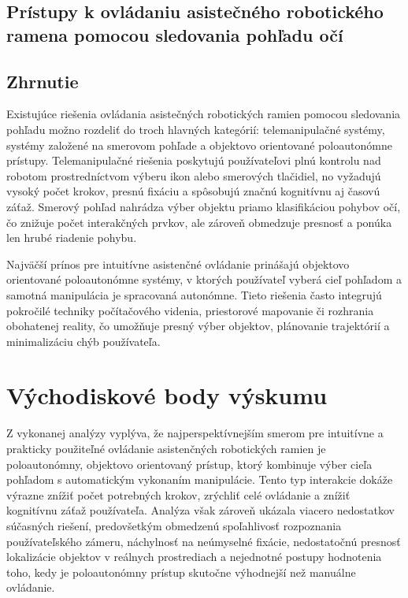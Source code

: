 \documentclass[11pt,english,a4paper]{article}
\begin{document}
        \subsection{Prístupy  k  ovládaniu  asistečného  robotického  ramena  pomocou  sledovania  pohľadu  očí}
        

        \subsection{Zhrnutie}\label{sec:summary}
Existujúce  riešenia  ovládania  asistečných  robotických  ramien  pomocou  sledovania  pohľadu  možno  rozdeliť  do  troch  hlavných  kategórií:  telemanipulačné  systémy,  systémy  založené  na  smerovom  pohľade  a  objektovo  orientované  poloautonómne  prístupy.  Telemanipulačné  riešenia  poskytujú  používateľovi  plnú  kontrolu  nad  robotom  prostredníctvom  výberu  ikon  alebo  smerových  tlačidiel,  no  vyžadujú  vysoký  počet  krokov,  presnú  fixáciu  a  spôsobujú  značnú  kognitívnu  aj  časovú  záťaž.  Smerový  pohľad  nahrádza  výber  objektu  priamo  klasifikáciou  pohybov  očí,  čo  znižuje  počet  interakčných  prvkov,  ale  zároveň  obmedzuje  presnosť  a  ponúka  len  hrubé  riadenie  pohybu.

Najväčší  prínos  pre  intuitívne  asistenčné  ovládanie  prinášajú  objektovo  orientované  poloautonómne  systémy,  v  ktorých  používateľ  vyberá  cieľ  pohľadom  a  samotná  manipulácia  je  spracovaná  autonómne.  Tieto  riešenia  často  integrujú  pokročilé  techniky  počítačového  videnia,  priestorové  mapovanie  či  rozhrania  obohatenej  reality,  čo  umožňuje  presný  výber  objektov,  plánovanie  trajektórií  a  minimalizáciu  chýb  používateľa.
                

\section{Východiskové  body  výskumu}  \label{sec:objectives}
Z vykonanej analýzy vyplýva, že najperspektívnejším smerom pre intuitívne a prakticky použiteľné ovládanie asistenčných robotických ramien je poloautonómny, objektovo orientovaný prístup, ktorý kombinuje výber cieľa pohľadom s automatickým vykonaním manipulácie. Tento typ interakcie dokáže výrazne znížiť počet potrebných krokov, zrýchliť celé ovládanie a znížiť kognitívnu záťaž používateľa. Analýza však zároveň ukázala viacero nedostatkov súčasných riešení, predovšetkým obmedzenú spoľahlivosť rozpoznania používateľského zámeru, náchylnosť na neúmyselné fixácie, nedostatočnú presnosť lokalizácie objektov v reálnych prostrediach a nejednotné postupy hodnotenia toho, kedy je poloautonómny prístup skutočne výhodnejší než manuálne ovládanie.
\end{document}
